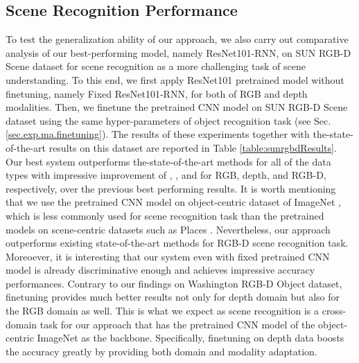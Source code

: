 \documentclass[10pt,journal,compsoc]{IEEEtran}
\begin{document}
\subsection{Scene Recognition Performance} \label{sec:exp.sceneRecognition}
To test the generalization ability of our approach, we also carry out comparative analysis of our best-performing model, namely ResNet101-RNN, on SUN RGB-D Scene \cite{Song_CVPR_2015} dataset for scene recognition as a more challenging task of scene understanding. To this end, we first apply ResNet101 pretrained model without finetuning, namely Fixed ResNet101-RNN, for both of RGB and depth modalities. Then, we finetune the pretrained CNN model on SUN RGB-D Scene dataset using the same hyper-parameters of object recognition task (see Sec. \ref{sec.exp.ma.finetuning}). The results of these experiments together with the-state-of-the-art results on this dataset are reported in Table \ref{table:sunrgbdResults}. Our best system outperforms the-state-of-the-art methods for all of the data types with impressive improvement of , , and  for RGB, depth, and RGB-D, respectively, over the previous best performing results. It is worth mentioning that we use the pretrained CNN model on object-centric dataset of ImageNet \cite{Deng_Imagenet_CVPR_2009}, which is less commonly used for scene recognition task than the pretrained models on scene-centric datasets such as Places \cite{Zhou_NIPS_2014}. Nevertheless, our approach outperforms existing state-of-the-art methods for RGB-D scene recognition task. Moreoever, it is interesting that our system even with fixed pretrained CNN model is already discriminative enough and achieves impressive accuracy performances. Contrary to our findings on Washington RGB-D Object dataset, finetuning provides much better results not only for depth domain but also for the RGB domain as well. This is what we expect as scene recognition is a cross-domain task for our approach that has the pretrained CNN model of the object-centric ImageNet as the backbone. Specifically, finetuning on depth data boosts the accuracy greatly by providing both domain and modality adaptation.
\end{document}
